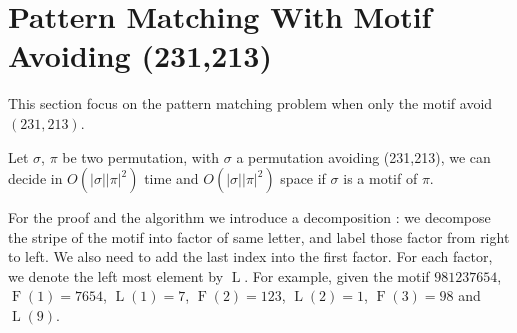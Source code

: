 \documentclass[a4paper]{llncs}
\newcommand{\ptext}{\pi}
\newcommand{\pmotif}{\sigma}
\DeclareMathOperator{\firsta}{L}
\newcommand{\first}[1]{\firsta({#1})}
\DeclareMathOperator{\factora}{F}
\newcommand{\factor}[1]{\factora({#1})}
\begin{document}

\section{Pattern Matching With Motif Avoiding (231,213)}	
\label{section:sigma only avoid 231 and 213}

This section focus on the pattern matching problem when only the motif avoid $(231,213)$.

\begin{proposition}
Let $\pmotif$, $\ptext$ 
be two permutation,
with  $\pmotif$ a permutation avoiding (231,213), 
we can decide in $O(|\pmotif||\ptext|^2)$ time
and $O(|\pmotif||\ptext|^2)$ space
if $\pmotif$ 
is a motif of $\ptext$.
\end{proposition}

			

			
For the proof and the algorithm we introduce a decomposition : we decompose the stripe of the motif into factor of same letter, and label those factor from right to left. We also need to add the last index into the first factor. For each factor, we denote the left most element by $\firsta$. For example, given the motif $981237654$, $\factor{1} =7654$, $\first{1}=7$, $\factor{2}=123$, $\first{2}=1$, $\factor{3}=98$ and $\first{9}$. \\
			
\end{document}
